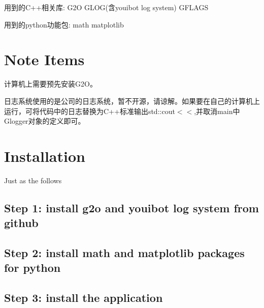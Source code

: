 \begin{DoxyEnumerate}
\item 用到的\+C++相关库\+: G2O G\+L\+OG(含youibot log system) G\+F\+L\+A\+GS
\item 用到的python功能包\+: math matplotlib 
\end{DoxyEnumerate}\hypertarget{index_note_section}{}\section{Note Items}\label{index_note_section}

\begin{DoxyEnumerate}
\item 计算机上需要预先安装\+G2\+O。
\item 日志系统使用的是公司的日志系统，暂不开源，请谅解。如果要在自己的计算机上运行，可将代码中的日志替换为\+C++标准输出{\ttfamily std\+::cout$<$$<$},并取消main中\+Glogger对象的定义即可。 
\end{DoxyEnumerate}\hypertarget{index_install_section}{}\section{Installation}\label{index_install_section}
Just as the follows \hypertarget{index_step1}{}\subsection{Step 1\+: install g2o and youibot log system from github}\label{index_step1}
\hypertarget{index_step2}{}\subsection{Step 2\+: install math and matplotlib packages for python}\label{index_step2}
\hypertarget{index_step3}{}\subsection{Step 3\+: install the application}\label{index_step3}

